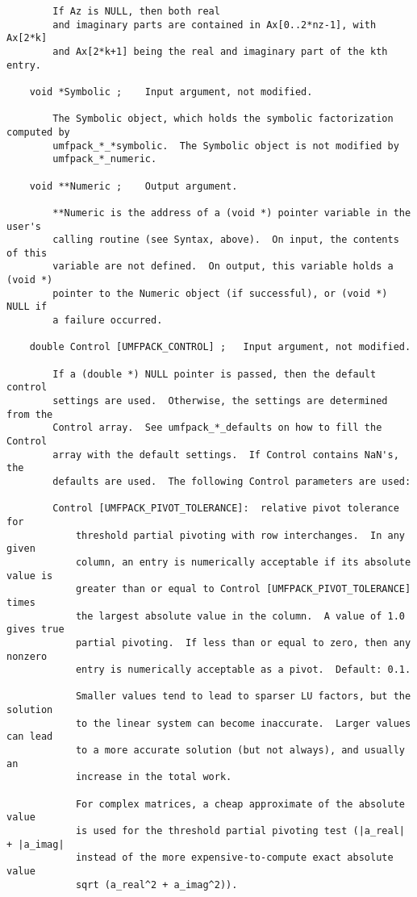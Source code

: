 \documentclass[11pt]{article}
\begin{document}
{\begin{verbatim}
        If Az is NULL, then both real
        and imaginary parts are contained in Ax[0..2*nz-1], with Ax[2*k]
        and Ax[2*k+1] being the real and imaginary part of the kth entry.

    void *Symbolic ;    Input argument, not modified.

        The Symbolic object, which holds the symbolic factorization computed by
        umfpack_*_*symbolic.  The Symbolic object is not modified by
        umfpack_*_numeric.

    void **Numeric ;    Output argument.

        **Numeric is the address of a (void *) pointer variable in the user's
        calling routine (see Syntax, above).  On input, the contents of this
        variable are not defined.  On output, this variable holds a (void *)
        pointer to the Numeric object (if successful), or (void *) NULL if
        a failure occurred.

    double Control [UMFPACK_CONTROL] ;   Input argument, not modified.

        If a (double *) NULL pointer is passed, then the default control
        settings are used.  Otherwise, the settings are determined from the
        Control array.  See umfpack_*_defaults on how to fill the Control
        array with the default settings.  If Control contains NaN's, the
        defaults are used.  The following Control parameters are used:

        Control [UMFPACK_PIVOT_TOLERANCE]:  relative pivot tolerance for
            threshold partial pivoting with row interchanges.  In any given
            column, an entry is numerically acceptable if its absolute value is
            greater than or equal to Control [UMFPACK_PIVOT_TOLERANCE] times
            the largest absolute value in the column.  A value of 1.0 gives true
            partial pivoting.  If less than or equal to zero, then any nonzero
            entry is numerically acceptable as a pivot.  Default: 0.1.

            Smaller values tend to lead to sparser LU factors, but the solution
            to the linear system can become inaccurate.  Larger values can lead
            to a more accurate solution (but not always), and usually an
            increase in the total work.

            For complex matrices, a cheap approximate of the absolute value
            is used for the threshold partial pivoting test (|a_real| + |a_imag|
            instead of the more expensive-to-compute exact absolute value
            sqrt (a_real^2 + a_imag^2)).


\end{verbatim}}
\end{document}
